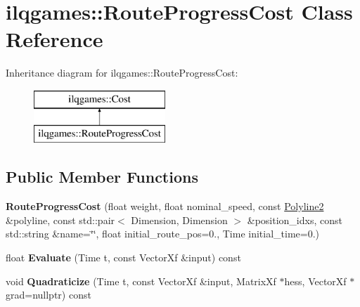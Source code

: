 \hypertarget{classilqgames_1_1_route_progress_cost}{}\section{ilqgames\+:\+:Route\+Progress\+Cost Class Reference}
\label{classilqgames_1_1_route_progress_cost}
Inheritance diagram for ilqgames\+:\+:Route\+Progress\+Cost\+:\begin{figure}[H]
\begin{center}
\leavevmode
\includegraphics[height=2.000000cm]{classilqgames_1_1_route_progress_cost}
\end{center}
\end{figure}
\subsection*{Public Member Functions}
\begin{DoxyCompactItemize}
\item 
{\bfseries Route\+Progress\+Cost} (float weight, float nominal\+\_\+speed, const \hyperlink{classilqgames_1_1_polyline2}{Polyline2} \&polyline, const std\+::pair$<$ Dimension, Dimension $>$ \&position\+\_\+idxs, const std\+::string \&name=\char`\"{}\char`\"{}, float initial\+\_\+route\+\_\+pos=0., Time initial\+\_\+time=0.)\hypertarget{classilqgames_1_1_route_progress_cost_ab2c7d990abd1ba3a5df7c6e475d8fec0}{}\label{classilqgames_1_1_route_progress_cost_ab2c7d990abd1ba3a5df7c6e475d8fec0}

\item 
float {\bfseries Evaluate} (Time t, const Vector\+Xf \&input) const \hypertarget{classilqgames_1_1_route_progress_cost_a93a76046fac60030e3f8767c0b8efea0}{}\label{classilqgames_1_1_route_progress_cost_a93a76046fac60030e3f8767c0b8efea0}

\item 
void {\bfseries Quadraticize} (Time t, const Vector\+Xf \&input, Matrix\+Xf $\ast$hess, Vector\+Xf $\ast$grad=nullptr) const \hypertarget{classilqgames_1_1_route_progress_cost_a6479d8f229190804ddf66417000c51c9}{}\label{classilqgames_1_1_route_progress_cost_a6479d8f229190804ddf66417000c51c9}

\end{DoxyCompactItemize}

